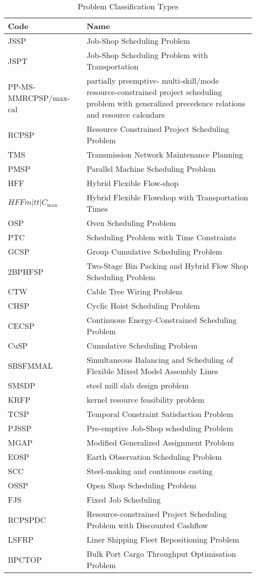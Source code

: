 \documentclass[a4paper]{article}
\begin{document}
\begin{table}[htbp]
\caption{\label{tab:classification}Problem Classification Types}
\begin{tabular}{lp{8cm}}\toprule
Code & Name \\ \midrule
JSSP & Job-Shop Scheduling Problem \\
JSPT & Job-Shop Scheduling Problem with Transportation \\
PP-MS-MMRCPSP/max-cal & partially preemptive- multi-skill/mode resource-constrained project scheduling problem with generalized precedence relations and resource calendars\\
RCPSP & Resource Constrained Project Scheduling Problem \\
TMS & Transmission Network Maintenance Planning \\
PMSP & Parallel Machine Scheduling Problem\\
HFF & Hybrid Flexible Flow-shop \\
$HFFm|tt|C_{\max}$ & Hybrid Flexible Flowshop with Transportation Times\\
OSP & Oven Scheduling Problem \\
PTC & Scheduling Problem with Time Constraints\\
GCSP & Group Cumulative Scheduling Problem \\
2BPHFSP & Two-Stage Bin Packing and Hybrid Flow Shop Scheduling Problem\\
CTW & Cable Tree Wiring Problem\\
CHSP & Cyclic Hoist Scheduling Problem \\
CECSP & Continuous Energy-Constrained Scheduling Problem \\
CuSP & Cumulative Scheduling Problem \\
SBSFMMAL & Simultaneous Balancing and Scheduling of Flexible Mixed Model Assembly Lines\\
SMSDP & steel mill slab design problem \\
KRFP & kernel resource feasibility problem\\
TCSP & Temporal Constraint Satisfaction Problem\\
PJSSP & Pre-emptive Job-Shop scheduling Problem\\
MGAP & Modified Generalized Assignment Problem\\
EOSP & Earth Observation Scheduling Problem \\
SCC & Steel-making and continuous casting \\
OSSP & Open Shop Scheduling Problem\\
FJS & Fixed Job Scheduling\\
RCPSPDC & Resource-constrained Project Scheduling Problem with Discounted Cashflow \\
LSFRP & Liner Shipping Fleet Repositioning Problem\\
BPCTOP & Bulk Port Cargo Throughput Optimisation Problem\\

\bottomrule
\end{tabular}
\end{table}
\end{document}
